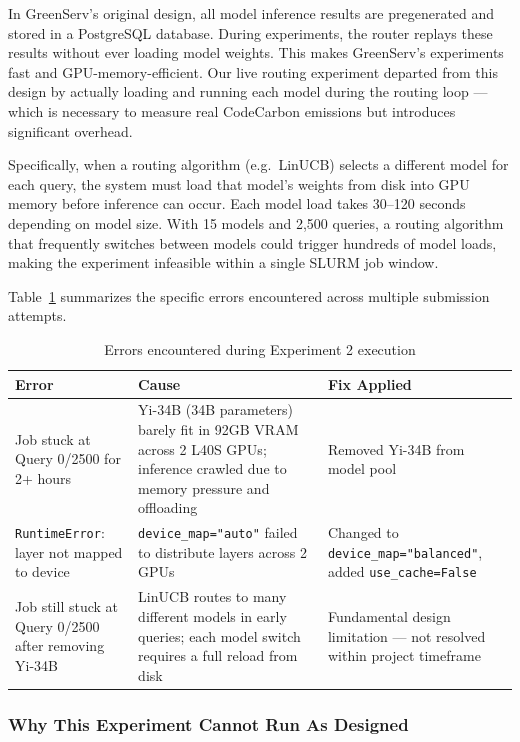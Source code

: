 \documentclass[12pt]{article}
\begin{document}
In GreenServ's original design, all model inference results are pregenerated
and stored in a PostgreSQL database. During experiments, the router replays
these results without ever loading model weights. This makes GreenServ's
experiments fast and GPU-memory-efficient. Our live routing experiment
departed from this design by actually loading and running each model during
the routing loop --- which is necessary to measure real CodeCarbon emissions
but introduces significant overhead.

Specifically, when a routing algorithm (e.g.\ LinUCB) selects a different
model for each query, the system must load that model's weights from disk
into GPU memory before inference can occur. Each model load takes 30--120
seconds depending on model size. With 15 models and 2,500 queries, a routing
algorithm that frequently switches between models could trigger hundreds of
model loads, making the experiment infeasible within a single SLURM job
window.

Table~\ref{tab:exp2errors} summarizes the specific errors encountered across
multiple submission attempts.

\begin{table}[H]
\centering
\caption{Errors encountered during Experiment 2 execution}
\label{tab:exp2errors}
\begin{tabular}{p{4cm} p{5cm} p{4.5cm}}
\toprule
\textbf{Error} & \textbf{Cause} & \textbf{Fix Applied} \\
\midrule
Job stuck at Query 0/2500 for 2+ hours &
Yi-34B (34B parameters) barely fit in 92GB VRAM across 2 L40S GPUs;
inference crawled due to memory pressure and offloading &
Removed Yi-34B from model pool \\
\addlinespace
\texttt{RuntimeError}: layer not mapped to device &
\texttt{device\_map="auto"} failed to distribute layers across 2 GPUs &
Changed to \texttt{device\_map="balanced"}, added \texttt{use\_cache=False} \\
\addlinespace
Job still stuck at Query 0/2500 after removing Yi-34B &
LinUCB routes to many different models in early queries;
each model switch requires a full reload from disk &
Fundamental design limitation --- not resolved within project timeframe \\
\bottomrule
\end{tabular}
\end{table}

\subsubsection{Why This Experiment Cannot Run As Designed}
\end{document}
